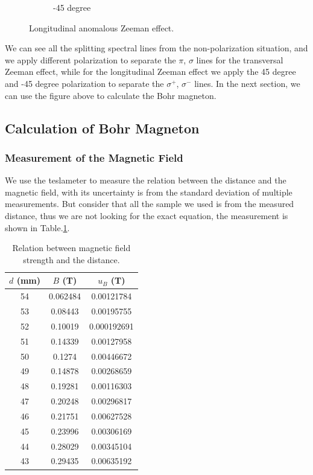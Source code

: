 \documentclass[a4paper,12pt]{article}
\begin{document}
\begin{figure}[H]
\begin{subfigure}[b]{0.3\textwidth}
            \caption{-45 degree}
        \end{subfigure}
        \caption{Longitudinal anomalous Zeeman effect.}
        \label{fig:lon_ano}
    \end{figure}
    
    \par We can see all the splitting spectral lines from the non-polarization situation, and we apply different polarization to separate the $\pi$, $\sigma$ lines for the transversal Zeeman effect, while for the longitudinal Zeeman effect we apply the 45 degree and -45 degree polarization to separate the $\sigma^+$, $\sigma^-$ lines. In the next section, we can use the figure above to calculate the Bohr magneton.
    
    \subsection{Calculation of Bohr Magneton}
    
    \subsubsection{Measurement of the Magnetic Field}
    
    \par We use the teslameter to measure the relation between the distance and the magnetic field, with its uncertainty is from the standard deviation of multiple measurements. But consider that all the sample we used is from the measured distance, thus we are not looking for the exact equation, the measurement is shown in Table.\ref{tab:magnetic field}.
    
    \begin{table}[H]
        \centering
        \caption{Relation between magnetic field strength and the distance.}
        \begin{tabular}{c|c|c}
            $d $ (mm)& $B $ (T)& $u_B $ (T) \\ \hline \hline
            54&	0.062484& 0.00121784 \\ \hline
            53&	0.08443	& 0.00195755 \\ \hline
            52&	0.10019	& 0.000192691 \\ \hline
            51&	0.14339	& 0.00127958 \\ \hline
            50&	0.1274	& 0.00446672 \\ \hline
            49&	0.14878	& 0.00268659 \\ \hline
            48&	0.19281	& 0.00116303 \\ \hline
            47&	0.20248	& 0.00296817 \\ \hline 
            46&	0.21751	& 0.00627528 \\ \hline
            45&	0.23996	& 0.00306169 \\ \hline
            44&	0.28029	& 0.00345104 \\ \hline
            43&	0.29435	& 0.00635192 \\ \hline
        \end{tabular}
        \label{tab:magnetic field}
    \end{table}
    
\end{document}
